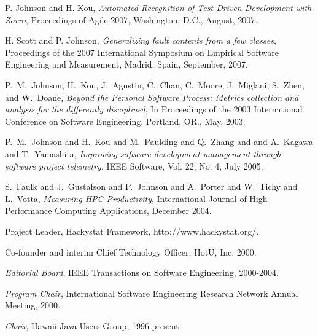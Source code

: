 \begin{Publications: Other Significant}

\item P. Johnson and H. Kou, {\em Automated Recognition of Test-Driven Development with Zorro}, 
Proceedings of Agile 2007, Washington, D.C., August, 2007. 

\item H. Scott and P. Johnson, {\em Generalizing fault contents from a few
classes}, Proceedings of the 2007 International Symposium on Empirical
Software Engineering and Measurement, Madrid, Spain, September, 2007.

\item P.~M.~Johnson, H.~Kou, J.~Agustin, C.~Chan, C.~Moore, 
J.~Miglani, S.~Zhen, and W.~Doane, {\em Beyond
the Personal Software Process: Metrics collection and analysis for the
differently disciplined}, In Proceedings of the 2003 International
Conference on Software Engineering, Portland, OR., May, 2003.

\item P.~M.~Johnson and H.~Kou and M.~Paulding and Q.~Zhang and
and A.~Kagawa and T.~Yamashita, {\em Improving software development
management through software project telemetry}, 
IEEE Software, Vol. 22, No. 4, July 2005.

\item S.~Faulk and J.~Gustafson and P.~Johnson and A.~Porter and W.~Tichy 
and L.~Votta, {\em Measuring {HPC} Productivity}, 
International Journal of High Performance Computing Applications, December 2004. 


\end{Publications: Other Significant}


\begin{Synergistic Activities}

\item {Project Leader}, Hackystat Framework, http://www.hackystat.org/.

\item {Co-founder and interim Chief Technology Officer}, HotU, Inc.  2000.

\item {\em Editorial Board}, IEEE Transactions on Software Engineering,
2000-2004.

\item {\em Program Chair}, International Software Engineering Research Network
 Annual Meeting, 2000.

\item {\em Chair}, Hawaii Java Users Group, 1996-present

\end{Synergistic Activities}

